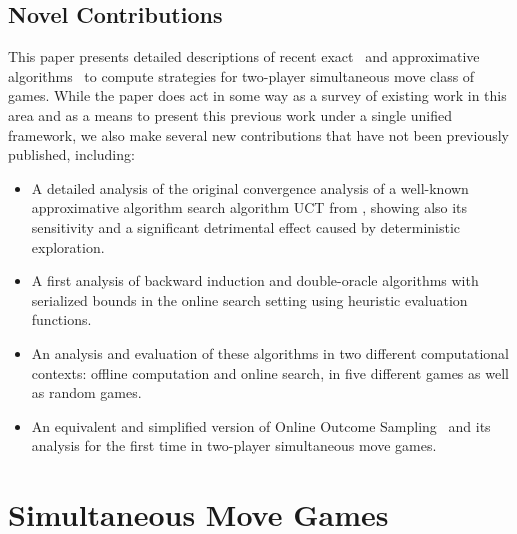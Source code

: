 \documentclass[preprint,12pt]{elsarticle}
\newcommand{\reviewchange}[1]{{\color{blue}#1}}
\begin{document}
\reviewchange{
\subsection{Novel Contributions}
\label{sec:contrib}

This paper presents detailed descriptions of recent exact~\cite{Bosansky13Using} and approximative
algorithms~\cite{Lanctot13Goofspiel,lisy2013-nips} to compute strategies for two-player simultaneous move class of games.
While the paper does act in some way as a survey of existing work in this area and as a means to present this previous work under a single unified framework, we also make several new contributions that have not been previously published, including:

\begin{itemize}
\item A detailed analysis of the original convergence analysis of a well-known approximative algorithm search algorithm UCT from \cite{Shafiei09}, showing also its sensitivity and a significant detrimental effect caused by deterministic exploration.
\item A first analysis of backward induction and double-oracle algorithms with serialized bounds in the online search setting using heuristic evaluation functions.
\item An analysis and evaluation of these algorithms in two different computational contexts: offline computation and online search, in five different games as well as random games.
\item An equivalent and simplified version of Online Outcome Sampling~\cite{15aamas-iioos} and its analysis for the first time in two-player simultaneous move games.
\end{itemize}

}

\section{Simultaneous Move Games}  \label{sec:smg}
\end{document}
